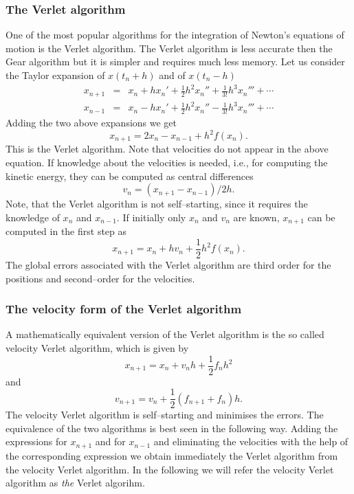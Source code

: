 \subsubsection{The Verlet algorithm}
One of the most popular algorithms for the integration of Newton's equations
of motion is the Verlet algorithm. The Verlet algorithm is less accurate then
the Gear algorithm but it is simpler and requires much less memory. 
Let us consider the Taylor expansion of $x(t_n + h)$ and of $x(t_n - h)$
\begin{eqnarray*}
  x_{n+1} & = &  x_n + h x_n' + \frac{1}{2} h^2 x_n'' 
         + \frac{1}{3!} h^3 x_n''' + \cdots \\
x_{n-1} & = &  x_n - h x_n' + \frac{1}{2} h^2 x_n'' 
         - \frac{1}{3!} h^3 x_n''' + \cdots 
\end{eqnarray*}
Adding the two above expansions we get
\begin{displaymath}
  x_{n+1} = 2 x_n - x_{n-1} + h^2 f(x_n).
\end{displaymath}
This is the Verlet algorithm. Note that velocities do not appear in the above
equation. If knowledge about the velocities is needed, i.e., for computing
the kinetic energy, they can be computed as central differences
\begin{equation}
\label{Eq:VerletV}
  v_n = (x_{n+1} - x_{n-1})/2h.
\end{equation}
Note, that the Verlet algorithm is not self--starting, since it requires the
knowledge of $x_n$ and $x_{n-1}$. If initially only $x_n$ and $v_n$ are known,
$x_{n+1}$ can be computed in the first step as
\begin{displaymath}
  x_{n+1} = x_n + h v_n + \frac{1}{2} h^2 f(x_n).
\end{displaymath}
The global errors associated with the Verlet algorithm are third order for the
positions and second--order for the velocities.

\subsubsection{The velocity form of the Verlet algorithm}
A mathematically equivalent version of the Verlet algorithm is the so called
velocity Verlet algorithm, which is given by
\begin{displaymath}
  x_{n+1} = x_n + v_n h + \frac{1}{2} f_n h^2
\end{displaymath}
and
\begin{displaymath}
  v_{n+1} = v_n + \frac{1}{2}(f_{n+1} + f_n) h.
\end{displaymath}
The velocity Verlet algorithm is self--starting and minimises the errors. The
equivalence of the two algorithms is best seen in the following way.
Adding the expressions for $x_{n+1}$ and for $x_{n-1}$ and eliminating the
velocities with the help of the corresponding expression we obtain immediately
the Verlet algorithm from the velocity Verlet algorithm. In the following we
will refer the velocity Verlet algorithm as \textit{the} Verlet algorihm. 

